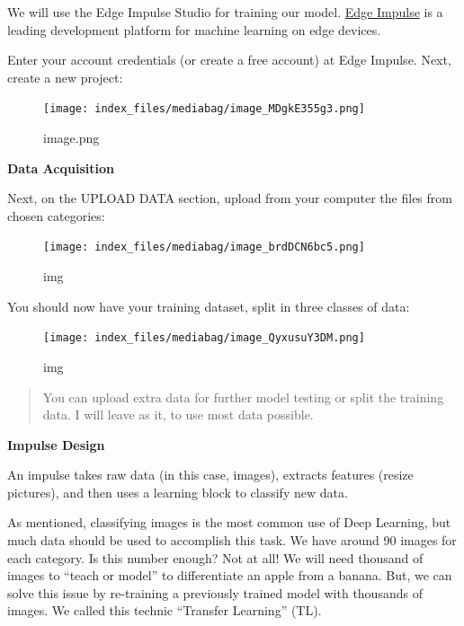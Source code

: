 \documentclass[
  letterpaper,
  DIV=11,
  numbers=noendperiod]{scrreprt}
\begin{document}

We will use the Edge Impulse Studio for training our model.
\href{https://www.edgeimpulse.com/}{Edge Impulse} is a leading
development platform for machine learning on edge devices.

Enter your account credentials (or create a free account) at Edge
Impulse. Next, create a new project:

\begin{figure}[H]

{\centering \texttt{[image: index\_files/mediabag/image\_MDgkE355g3.png]}

}

\caption{image.png}

\end{figure}

\textbf{Data Acquisition}

Next, on the UPLOAD DATA section, upload from your computer the files
from chosen categories:

\begin{figure}[H]

{\centering \texttt{[image: index\_files/mediabag/image\_brdDCN6bc5.png]}

}

\caption{img}

\end{figure}

You should now have your training dataset, split in three classes of
data:

\begin{figure}[H]

{\centering \texttt{[image: index\_files/mediabag/image\_QyxusuY3DM.png]}

}

\caption{img}

\end{figure}

\begin{quote}
You can upload extra data for further model testing or split the
training data. I will leave as it, to use most data possible.
\end{quote}

\textbf{Impulse Design}

An impulse takes raw data (in this case, images), extracts features
(resize pictures), and then uses a learning block to classify new data.

As mentioned, classifying images is the most common use of Deep
Learning, but much data should be used to accomplish this task. We have
around 90 images for each category. Is this number enough? Not at all!
We will need thousand of images to ``teach or model'' to differentiate
an apple from a banana. But, we can solve this issue by re-training a
previously trained model with thousands of images. We called this
technic ``Transfer Learning'' (TL).
\end{document}

